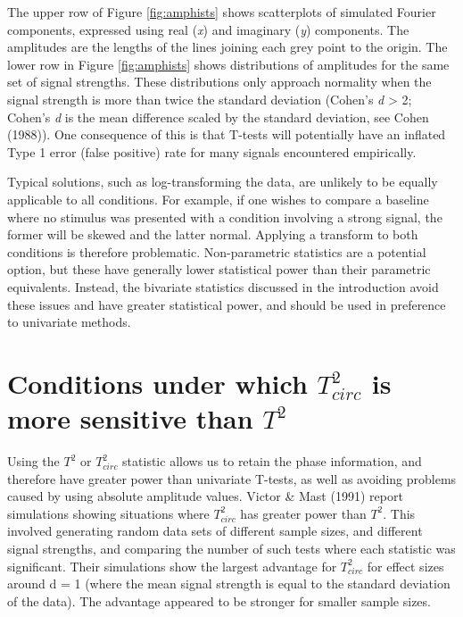 \documentclass[]{article}
\begin{document}
The upper row of Figure \ref{fig:amphists} shows scatterplots of simulated Fourier components, expressed using real (\emph{x}) and imaginary (\emph{y}) components. The amplitudes are the lengths of the lines joining each grey point to the origin. The lower row in Figure \ref{fig:amphists} shows distributions of amplitudes for the same set of signal strengths. These distributions only approach normality when the signal strength is more than twice the standard deviation (Cohen's \emph{d} \textgreater{} 2; Cohen's \emph{d} is the mean difference scaled by the standard deviation, see Cohen (1988)). One consequence of this is that T-tests will potentially have an inflated Type 1 error (false positive) rate for many signals encountered empirically.

Typical solutions, such as log-transforming the data, are unlikely to be equally applicable to all conditions. For example, if one wishes to compare a baseline where no stimulus was presented with a condition involving a strong signal, the former will be skewed and the latter normal. Applying a transform to both conditions is therefore problematic. Non-parametric statistics are a potential option, but these have generally lower statistical power than their parametric equivalents. Instead, the bivariate statistics discussed in the introduction avoid these issues and have greater statistical power, and should be used in preference to univariate methods.

\hypertarget{conditions-under-which-t2_circ-is-more-sensitive-than-t2}{%
\section{\texorpdfstring{Conditions under which \(T^2_{circ}\) is more sensitive than \(T^2\)}{Conditions under which T\^{}2\_\{circ\} is more sensitive than T\^{}2}}\label{conditions-under-which-t2_circ-is-more-sensitive-than-t2}}

Using the \(T^2\) or \(T^2_{circ}\) statistic allows us to retain the phase information, and therefore have greater power than univariate T-tests, as well as avoiding problems caused by using absolute amplitude values. Victor \& Mast (1991) report simulations showing situations where \(T^2_{circ}\) has greater power than \(T^2\). This involved generating random data sets of different sample sizes, and different signal strengths, and comparing the number of such tests where each statistic was significant. Their simulations show the largest advantage for \(T^2_{circ}\) for effect sizes around d = 1 (where the mean signal strength is equal to the standard deviation of the data). The advantage appeared to be stronger for smaller sample sizes.
\end{document}
